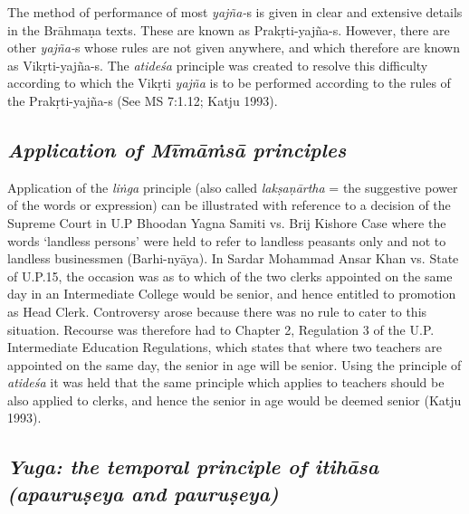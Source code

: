 The method of performance of most \textit{yajña-}s is given in clear and extensive details in the Brāhmaṇa texts. These are known as Prakṛti-yajña-s. However, there are other \textit{yajña-}s whose rules are not given anywhere, and which therefore are known as Vikṛti-yajña-s. The \textit{atideśa} principle was created to resolve this difficulty according to which the Vikṛti \textit{yajña} is to be performed according to the rules of the Prakṛti-yajña-s (See MS 7:1.12; Katju 1993).


\subsection*{\textit{Application of Mīmāṁsā principles}}

Application of the \textit{liṅga} principle (also called \textit{lakṣaṇārtha} = the suggestive power of the words or expression) can be illustrated with reference to a decision of the Supreme Court in U.P Bhoodan Yagna Samiti vs. Brij Kishore Case where the words ‘landless persons’ were held to refer to landless peasants only and not to landless businessmen (Barhi-nyāya). In Sardar Mohammad Ansar Khan vs. State of U.P.15, the occasion was as to which of the two clerks appointed on the same day in an Intermediate College would be senior, and hence entitled to promotion as Head Clerk. Controversy arose because there was no rule to cater to this situation. Recourse was therefore had to Chapter 2, Regulation 3 of the U.P. Intermediate Education Regulations, which states that where two teachers are appointed on the same day, the senior in age will be senior. Using the principle of \textit{atideśa} it was held that the same principle which applies to teachers should be also applied to clerks, and hence the senior in age would be deemed senior (Katju 1993).

\subsection*{\textit{Yuga: the temporal principle of itihāsa (apauruṣeya and pauruṣeya)}}

